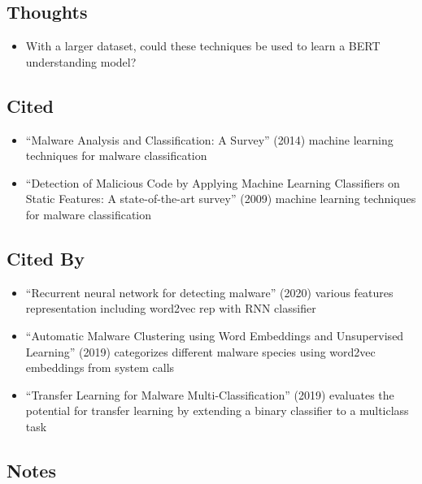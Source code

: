 \documentclass{article}
\begin{document}
\subsection*{Thoughts}
\begin{itemize}
\item With a larger dataset, could these techniques be used to learn a BERT understanding model?
\end{itemize}

\subsection*{Cited}
\begin{itemize}
\item ``Malware Analysis and Classification: A Survey'' (2014) machine learning techniques for malware classification
\item ``Detection of Malicious Code by Applying Machine Learning Classifiers on Static Features: A state-of-the-art survey'' (2009) machine learning techniques for malware classification
\end{itemize}

\subsection*{Cited By}
\begin{itemize}
\item ``Recurrent neural network for detecting malware'' (2020) various features representation including word2vec rep with RNN classifier
\item ``Automatic Malware Clustering using Word Embeddings and Unsupervised Learning'' (2019) categorizes different malware species using word2vec embeddings from system calls
\item ``Transfer Learning for Malware Multi-Classification'' (2019) evaluates the potential for transfer learning by extending a binary classifier to a multiclass task
\end{itemize}

\subsection*{Notes}
\end{document}
